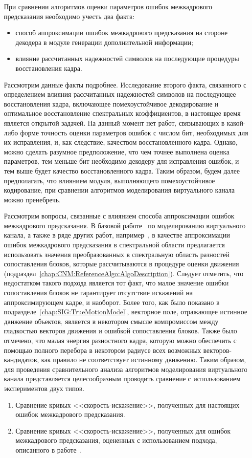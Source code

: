 При сравнении алгоритмов оценки параметров ошибок межкадрового предсказания необходимо учесть два факта:
\begin{itemize}
    \item способ аппроксимации ошибок межкадрового предсказания на стороне декодера в модуле генерации дополнительной информации;
    \item влияние рассчитанных надежностей символов на последующие процедуры восстановления кадра.
\end{itemize}

Рассмотрим данные факты подробнее. Исследование второго факта, связанного с определением влияния рассчитанных надежностей символов на последующее восстановления кадра, включающее помехоустойчивое декодирование и оптимальное восстановление спектральных коэффициентов, в настоящее время является открытой задачей. На данный момент нет работ, связывающих в какой-либо форме точность оценки параметров ошибок с числом бит, необходимых для их исправления, и, как следствие, качеством восстановленного кадра. Однако, можно сделать разумное предположение, что чем точнее выполнена оценка параметров, тем меньше бит необходимо декодеру для исправления ошибок, и тем выше будет качество восстановленного кадра. Таким образом, будем далее предполагать, что влиянием модуля, выполняющего помехоустойчивое кодирование, при сравнении алгоритмов моделирования виртуального канала можно пренебречь.

Рассмотрим вопросы, связанные с влиянием способа аппроксимации ошибок межкадрового предсказания. В базовой работе~\cite{4498429} по моделированию виртуального канала, а также в ряде других работ, например~\cite{4959735}, в качестве аппроксимации ошибок межкадрового предсказания в спектральной области предлагается  использовать значения преобразованных в спектральную область разностей сопоставления блоков, которые рассчитываются в процедуре оценки движения (подраздел~\ref{chap:CNM:ReferenceAlgo:AlgoDescription}). Следует отметить, что недостатком такого подхода является тот факт, что малое значение ошибки сопоставления блоков не гарантирует отсутствие искажений на аппроксимирующем кадре, и наоборот. Более того, как было показано в подразделе~\ref{chap:SIG:TrueMotionModel}, векторное поле, отражающее истинное движение объектов, является в некотором смысле компромиссом между гладкостью векторов движения и ошибкой сопоставления блоков. Также было отмечено, что малая энергия разностного кадра, которую можно обеспечить с помощью полного перебора в некотором радиусе всех возможных векторов-кандидатов, как правило не соответствует истинному движению. Таким образом, для проведения сравнительного анализа алгоритмов моделирования виртуального канала представляется целесообразным проводить сравнение с использованием экспериментов двух типов.
\begin{enumerate}
    \item Сравнение кривых <<скорость-искажение>>, полученных для настоящих ошибок межкадрового предсказания.
    \item Сравнение кривых <<скорость-искажение>>, полученных для ошибок межкадрового предсказания, оцененных с использованием подхода, описанного в работе~\cite{4498429}.
\end{enumerate}

